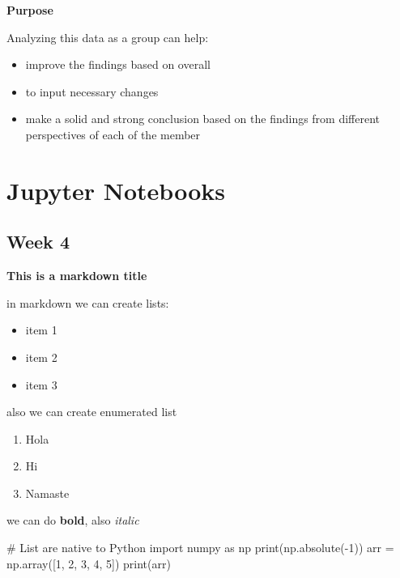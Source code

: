 \documentclass[
  letterpaper,
  DIV=11,
  numbers=noendperiod]{scrreprt}
\newenvironment{Shaded}{\begin{snugshade}}{\end{snugshade}}
\newcommand{\BuiltInTok}[1]{\textcolor[rgb]{0.00,0.23,0.31}{#1}}
\newcommand{\CommentTok}[1]{\textcolor[rgb]{0.37,0.37,0.37}{#1}}
\newcommand{\DecValTok}[1]{\textcolor[rgb]{0.68,0.00,0.00}{#1}}
\newcommand{\ImportTok}[1]{\textcolor[rgb]{0.00,0.46,0.62}{#1}}
\newcommand{\NormalTok}[1]{\textcolor[rgb]{0.00,0.23,0.31}{#1}}
\newcommand{\OperatorTok}[1]{\textcolor[rgb]{0.37,0.37,0.37}{#1}}
\providecommand{\tightlist}{%
  \setlength{\itemsep}{0pt}\setlength{\parskip}{0pt}}\usepackage{longtable,booktabs,array}
\begin{document}
\textbf{Purpose}

Analyzing this data as a group can help:

\begin{itemize}
\item
  improve the findings based on overall
\item
  to input necessary changes
\item
  make a solid and strong conclusion based on the findings from
  different perspectives of each of the member
\end{itemize}

\section{Jupyter Notebooks}\label{jupyter-notebooks}

\subsection{Week 4}\label{week-4}

\textbf{This is a markdown title}

in markdown we can create lists:

\begin{itemize}
\tightlist
\item
  item 1
\item
  item 2
\item
  item 3
\end{itemize}

also we can create enumerated list

\begin{enumerate}
\def\labelenumi{\arabic{enumi}.}
\tightlist
\item
  Hola
\item
  Hi
\item
  Namaste
\end{enumerate}

we can do \textbf{bold}, also \emph{italic}

\begin{Shaded}
\begin{Highlighting}[]
\CommentTok{\# List are native to Python}
\ImportTok{import}\NormalTok{ numpy }\ImportTok{as}\NormalTok{ np}
\BuiltInTok{print}\NormalTok{(np.absolute(}\OperatorTok{{-}}\DecValTok{1}\NormalTok{))}
\NormalTok{arr }\OperatorTok{=}\NormalTok{ np.array([}\DecValTok{1}\NormalTok{, }\DecValTok{2}\NormalTok{, }\DecValTok{3}\NormalTok{, }\DecValTok{4}\NormalTok{, }\DecValTok{5}\NormalTok{])}
\BuiltInTok{print}\NormalTok{(arr)}
\end{Highlighting}
\end{Shaded}
\end{document}
